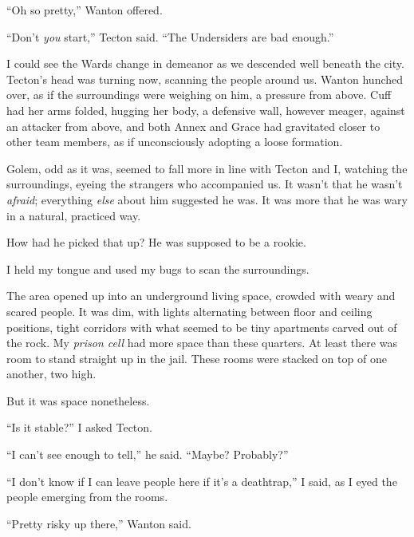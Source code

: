 ``Oh so pretty,'' Wanton offered.



``Don't \emph{you} start,'' Tecton said.  ``The Undersiders are bad enough.''



I could see the Wards change in demeanor as we descended well beneath the city.  Tecton's head was turning now, scanning the people around us.  Wanton hunched over, as if the surroundings were weighing on him, a pressure from above.  Cuff had her arms folded, hugging her body, a defensive wall, however meager, against an attacker from above, and both Annex and Grace had gravitated closer to other team members, as if unconsciously adopting a loose formation.



Golem, odd as it was, seemed to fall more in line with Tecton and I, watching the surroundings, eyeing the strangers who accompanied us.  It wasn't that he wasn't \emph{afraid}; everything \emph{else} about him suggested he was.  It was more that he was wary in a natural, practiced way.



How had he picked that up?  He was supposed to be a rookie.



I held my tongue and used my bugs to scan the surroundings.



The area opened up into an underground living space, crowded with weary and scared people.  It was dim, with lights alternating between floor and ceiling positions, tight corridors with what seemed to be tiny apartments carved out of the rock.  My \emph{prison cell} had more space than these quarters.  At least there was room to stand straight up in the jail.  These rooms were stacked on top of one another, two high.



But it was space nonetheless.



``Is it stable?'' I asked Tecton.



``I can't see enough to tell,'' he said.  ``Maybe?  Probably?''



``I don't know if I can leave people here if it's a deathtrap,'' I said, as I eyed the people emerging from the rooms.



``Pretty risky up there,'' Wanton said.



